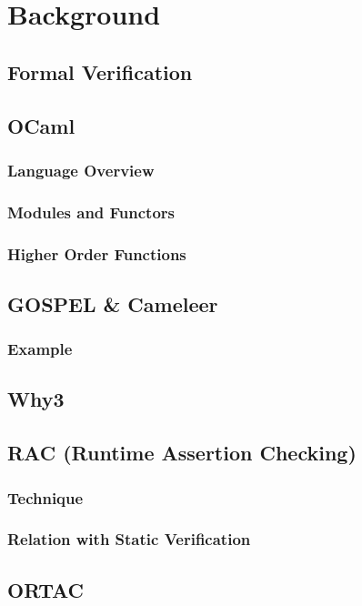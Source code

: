 
%

\chapter{Background}
\label{cha:background}

\section{Formal Verification}
\label{sec:formal_verification}

\section{OCaml}
\label{sec:ocaml}

\subsection{Language Overview} %
\label{sub:language_overview}

\subsection{Modules and Functors} %
\label{sub:modules_and_functors}

\subsection{Higher Order Functions}
\label{sub:higher_order_functions}

\section{GOSPEL \& Cameleer}
\label{sec:gospel_and_cameleer}

\subsection{Example}
\label{sub:example}

\section{Why3}
\label{sec:why3}

\section{RAC (Runtime Assertion Checking)}
\label{sec:rac}

\subsection{Technique}
\label{sub:technique}

\subsection{Relation with Static Verification}
\label{sub:relation_with_static_verification}

\section{ORTAC}
\label{sec:ortac}